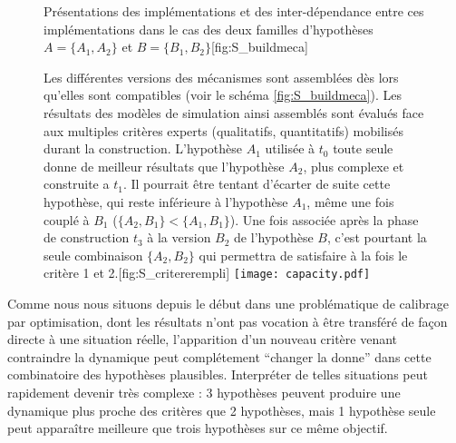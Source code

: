 \begin{figure}[p]
	\begin{sidecaption}[fortoc]{Présentations des implémentations et des inter-dépendance entre ces implémentations dans le cas des deux familles d'hypothèses $A = \{A_1,A_2\}$ et $B = \{B_1, B_2\}$}[fig:S_buildmeca]
	 \centering
	 \qquad
	\end{sidecaption}
\end{figure}


\begin{figure}[htbp]
\begin{sidecaption}{Les différentes versions des mécanismes sont assemblées dès lors qu'elles sont compatibles (voir le schéma \ref{fig:S_buildmeca}). Les résultats des modèles de simulation ainsi assemblés sont évalués face aux multiples critères experts (qualitatifs, quantitatifs) mobilisés durant la construction. L'hypothèse $A_1$ utilisée à $t_0$ toute seule donne de meilleur résultats que l'hypothèse $A_2$, plus complexe et construite a $t_1$. Il pourrait être tentant d'écarter de suite cette hypothèse, qui reste inférieure à l'hypothèse $A_1$, même une fois couplé à $B_1$ ($\{A_2,B_1\} < \{A_1,B_1\}$). Une fois associée après la phase de construction $t_3$ à la version $B_2$ de l'hypothèse $B$, c'est pourtant la seule combinaison $\{A_2,B_2\}$ qui permettra de satisfaire à la fois le critère 1 et 2.}[fig:S_critererempli]
  \centering
 \texttt{[image: capacity.pdf]}
  \end{sidecaption}
\end{figure}

Comme nous nous situons depuis le début dans une problématique de calibrage par optimisation, dont les résultats n'ont pas vocation à être transféré de façon directe à une situation réelle, l'apparition d'un nouveau critère venant contraindre la dynamique peut complétement \enquote{changer la donne} dans cette combinatoire des hypothèses plausibles. Interpréter de telles situations peut rapidement devenir très complexe : 3 hypothèses peuvent produire une dynamique plus proche des critères que 2 hypothèses, mais 1 hypothèse seule peut apparaître meilleure que trois hypothèses sur ce même objectif.

